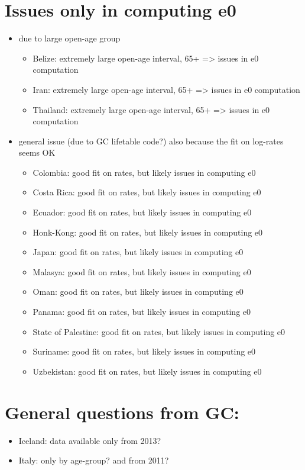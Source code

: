 \documentclass{article}
\begin{document}
	
	\section*{Issues only in computing e0}
	\begin{itemize}
	\item due to large open-age group
		\begin{itemize}
\item Belize: extremely large open-age interval, 65+ => issues in e0 computation
\item Iran: extremely large open-age interval, 65+ => issues in e0 computation
\item Thailand: extremely large open-age interval, 65+ => issues in e0 computation
\end{itemize}
	\item general issue (due to GC lifetable code?) also because the fit on log-rates seems OK
		\begin{itemize}
	\item Colombia: good fit on rates, but likely issues in computing e0
\item Costa Rica: good fit on rates, but likely issues in computing e0
\item Ecuador: good fit on rates, but likely issues in computing e0
\item Honk-Kong: good fit on rates, but likely issues in computing e0
\item Japan: good fit on rates, but likely issues in computing e0
\item Malasya: good fit on rates, but likely issues in computing e0
\item Oman: good fit on rates, but likely issues in computing e0
\item Panama: good fit on rates, but likely issues in computing e0
\item State of Palestine: good fit on rates, but likely issues in computing e0
\item Suriname: good fit on rates, but likely issues in computing e0
\item Uzbekistan: good fit on rates, but likely issues in computing e0
\end{itemize}
	
	\end{itemize}
	
\section*{General questions from GC:}
	
	\begin{itemize}
	\item Iceland: data available only from 2013?
\item Italy: only by age-group? and from 2011?
	\end{itemize}

	
\end{document}

